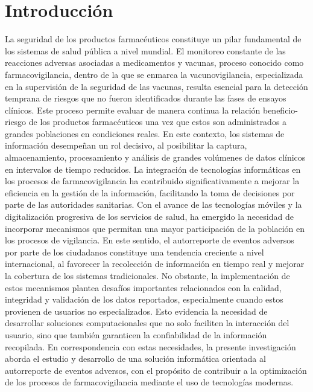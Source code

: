 \chapter{Introducción}\label{chapter:introduction}

La seguridad de los productos farmacéuticos constituye un pilar fundamental de los sistemas de salud pública a nivel mundial. 
El monitoreo constante de las reacciones adversas asociadas a medicamentos y vacunas, proceso conocido como farmacovigilancia, dentro de la que se enmarca la vacunovigilancia, especializada en la supervisión de la seguridad de las vacunas, resulta esencial para la detección temprana de riesgos que no fueron identificados durante las fases de ensayos clínicos. 
Este proceso permite evaluar de manera continua la relación beneficio-riesgo de los productos farmacéuticos una vez que estos son administrados a grandes poblaciones en condiciones reales.
En este contexto, los sistemas de información desempeñan un rol decisivo, al posibilitar la captura, almacenamiento, procesamiento y análisis de grandes volúmenes de datos clínicos en intervalos de tiempo reducidos. 
La integración de tecnologías informáticas en los procesos de farmacovigilancia ha contribuido significativamente a mejorar la eficiencia en la gestión de la información, facilitando la toma de decisiones por parte de las autoridades sanitarias.
Con el avance de las tecnologías móviles y la digitalización progresiva de los servicios de salud, ha emergido la necesidad de incorporar mecanismos que permitan una mayor participación de la población en los procesos de vigilancia. 
En este sentido, el autorreporte de eventos adversos por parte de los ciudadanos constituye una tendencia creciente a nivel internacional, al favorecer la recolección de información en tiempo real y mejorar la cobertura de los sistemas tradicionales.
No obstante, la implementación de estos mecanismos plantea desafíos importantes relacionados con la calidad, integridad y validación de los datos reportados, especialmente cuando estos provienen de usuarios no especializados. 
Esto evidencia la necesidad de desarrollar soluciones computacionales que no solo faciliten la interacción del usuario, sino que también garanticen la confiabilidad de la información recopilada.
En correspondencia con estas necesidades, la presente investigación aborda el estudio y desarrollo de una solución informática orientada al autorreporte de eventos adversos, con el propósito de contribuir a la optimización de los procesos de farmacovigilancia mediante el uso de tecnologías modernas.

